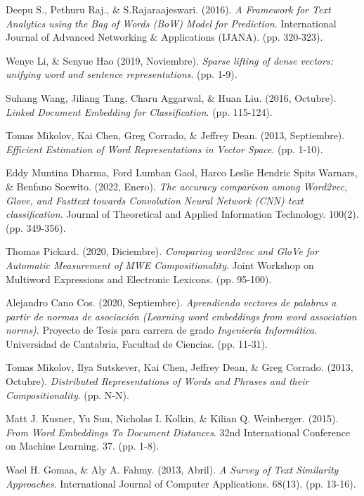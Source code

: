 \documentclass[12pt,a4paper]{article}
\begin{document}
\begin{sloppypar}
\begin{thebibliography}{9}
Deepu S., Pethuru Raj., \& S.Rajaraajeswari. (2016). \textit{A Framework for Text Analytics using the Bag of Words (BoW) Model for Prediction}. International Journal of Advanced Networking \& Applications (IJANA). (pp. 320-323).

Wenye Li, \& Senyue Hao (2019, Noviembre). \textit{Sparse lifting of dense vectors: unifying word and sentence representations}. (pp. 1-9).

Suhang Wang, Jiliang Tang, Charu Aggarwal, \& Huan Liu. (2016, Octubre). \textit{Linked Document Embedding for Classiﬁcation}. (pp. 115-124).

Tomas Mikolov, Kai Chen, Greg Corrado, \& Jeffrey Dean. (2013, Septiembre). \textit{Efficient Estimation of Word Representations in Vector Space}. (pp. 1-10).

Eddy Muntina Dharma, Ford Lumban Gaol, Harco Leslie Hendric Spits Warnars, \& Benfano Soewito. (2022, Enero). \textit{The accuracy comparison among Word2vec, Glove, and Fasttext towards Convolution Neural Network (CNN) text classification}. Journal of Theoretical and Applied Information Technology. 100(2). (pp. 349-356).

Thomas Pickard. (2020, Diciembre). \textit{Comparing word2vec and GloVe for Automatic Measurement of MWE Compositionality}. Joint Workshop on Multiword Expressions and Electronic Lexicons. (pp. 95-100).

Alejandro Cano Cos. (2020, Septiembre). \textit{Aprendiendo vectores de palabras a partir de normas de asociación (Learning word embeddings from word association norms)}. Proyecto de Tesis para carrera de grado \textit{Ingeniería Informática}. Universidad de Cantabria, Facultad de Ciencias. (pp. 11-31).

Tomas Mikolov, Ilya Sutskever, Kai Chen, Jeffrey Dean, \& Greg Corrado. (2013, Octubre). \textit{Distributed Representations of Words and Phrases and their Compositionality}. (pp. N-N).

Matt J. Kusner, Yu Sun, Nicholas I. Kolkin, \& Kilian Q. Weinberger. (2015). \textit{From Word Embeddings To Document Distances}. 32nd International Conference on Machine Learning. 37. (pp. 1-8).

Wael H. Gomaa, \& Aly A. Fahmy. (2013, Abril). \textit{A Survey of Text Similarity Approaches}. International Journal of Computer Applications. 68(13). (pp. 13-16).


\end{thebibliography}
\end{sloppypar}
\end{document}
